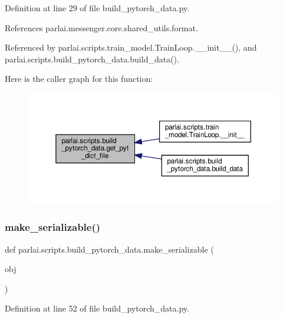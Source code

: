 Definition at line 29 of file build\+\_\+pytorch\+\_\+data.\+py.



References parlai.\+messenger.\+core.\+shared\+\_\+utils.\+format.



Referenced by parlai.\+scripts.\+train\+\_\+model.\+Train\+Loop.\+\_\+\+\_\+init\+\_\+\+\_\+(), and parlai.\+scripts.\+build\+\_\+pytorch\+\_\+data.\+build\+\_\+data().

Here is the caller graph for this function\+:
\nopagebreak
\begin{figure}[H]
\begin{center}
\leavevmode
\includegraphics[width=350pt]{namespaceparlai_1_1scripts_1_1build__pytorch__data_a6ec85a5842150af78f5178d75075b0cc_icgraph}
\end{center}
\end{figure}
\mbox{\label{namespaceparlai_1_1scripts_1_1build__pytorch__data_a1c8f4633b7dc8e990a3e1f6c3e92bd3f}} 
\subsubsection{\texorpdfstring{make\+\_\+serializable()}{make\_serializable()}}
{\footnotesize\ttfamily def parlai.\+scripts.\+build\+\_\+pytorch\+\_\+data.\+make\+\_\+serializable (\begin{DoxyParamCaption}\item[{}]{obj }\end{DoxyParamCaption})}



Definition at line 52 of file build\+\_\+pytorch\+\_\+data.\+py.



